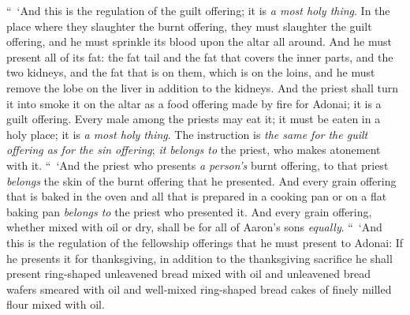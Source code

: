\begin{biblechapter} %
 “ ‘And this is the regulation of the guilt offering; it is \textit{a most holy thing}.
\verse In the place where they slaughter the burnt offering, they must slaughter the guilt offering, and he must sprinkle its blood upon the altar all around.
\verse And he must present all of its fat: the fat tail and the fat that covers the inner parts,
\verse and the two kidneys, and the fat that is on them, which is on the loins, and he must remove the lobe on the liver in addition to the kidneys.
\verse And the priest shall turn it into smoke it on the altar as a food offering made by fire for Adonai; it is a guilt offering.
\verse Every male among the priests may eat it; it must be eaten in a holy place; it is \textit{a most holy thing}.
\verse The instruction is \textit{the same for the guilt offering as for the sin offering}; \textit{it belongs to} the priest, who makes atonement with it.
 “ ‘And the priest who presents \textit{a person’s} burnt offering, to that priest \textit{belongs} the skin of the burnt offering that he presented.
\verse And every grain offering that is baked in the oven and all that is prepared in a cooking pan or on a flat baking pan \textit{belongs to} the priest who presented it.
\verse And every grain offering, whether mixed with oil or dry, shall be for all of Aaron’s sons \textit{equally}.
 “ ‘And this is the regulation of the fellowship offerings that he must present to Adonai:
\verse If he presents it for thanksgiving, in addition to the thanksgiving sacrifice he shall present ring-shaped unleavened bread mixed with oil and unleavened bread wafers smeared with oil and well-mixed ring-shaped bread cakes of finely milled flour mixed with oil.

\end{biblechapter}
